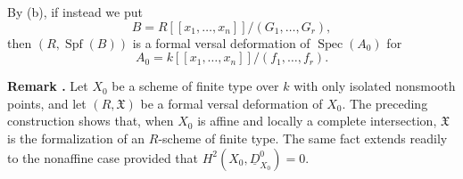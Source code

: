 By (b), if instead we put
\[
B=R[[x_1,\ldots,x_n]]/(G_1,\ldots,G_r),
\]
then $(R,\operatorname{Spf}(B))$ is a formal versal deformation of
$\operatorname{Spec}(A_0)$ for
\[
A_0=k[[x_1,\ldots,x_n]]/(f_1,\ldots,f_r).
\]

\medskip
\noindent\textbf{Remark .}
Let $X_0$ be a scheme of finite type over $k$ with only isolated
nonsmooth points, and let $(R,\mathfrak X)$ be a formal versal
deformation of $X_0$. The preceding construction shows that, when
$X_0$ is affine and locally a complete intersection, $\mathfrak X$
is the formalization of an $R$-scheme of finite type. The same fact
extends readily to the nonaffine case provided that
$H^2(X_0,\underline D^0_{X_0})=0$.

